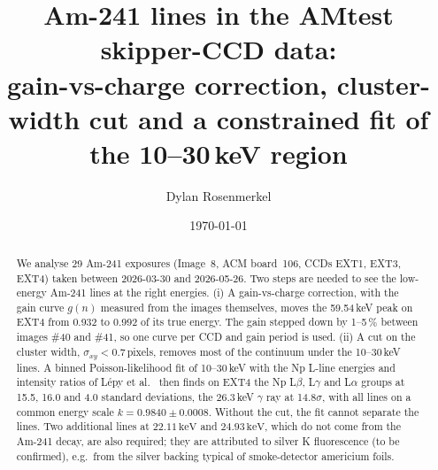 \documentclass[11pt,a4paper]{article}
\title{Am-241 lines in the AMtest skipper-CCD data:\\
gain-vs-charge correction, cluster-width cut and a constrained fit of the 10--30\,keV region}
\author{Dylan Rosenmerkel}
\date{\today}
\newcommand{\sxy}{\sigma_{xy}}
\newcommand{\keV}{\,\mathrm{keV}}
\begin{document}
\maketitle

\begin{abstract}
We analyse 29 Am-241 exposures (Image~8, ACM board~106, CCDs EXT1, EXT3, EXT4) taken between
2026-03-30 and 2026-05-26. Two steps are needed to see the low-energy Am-241 lines at the right energies.
(i) A gain-vs-charge correction, with the gain curve $g(n)$ measured from the images themselves, moves the
59.54\,keV peak on EXT4 from 0.932 to 0.992 of its true energy. The gain stepped down by 1--5\,\% between images
\#40 and \#41, so one curve per CCD and gain period is used. (ii) A cut on the cluster width, $\sxy<0.7$\,pixels,
removes most of the continuum under the 10--30\,keV lines. A binned Poisson-likelihood fit of 10--30\,keV with
the Np L-line energies and intensity ratios of L\'epy et al.~\cite{lepy2008} then finds on EXT4 the Np L$\beta$,
L$\gamma$ and L$\alpha$ groups at 15.5, 16.0 and 4.0 standard deviations, the 26.3\,keV $\gamma$ ray at
14.8$\sigma$, with all lines on a common energy scale $k = 0.9840 \pm 0.0008$. Without the cut, the fit cannot
separate the lines. Two additional lines at $22.11\keV$ and $24.93\keV$, which do not come from the Am-241 decay,
are also required; they are attributed to silver K fluorescence (to be confirmed), e.g.\ from the silver backing
typical of smoke-detector americium foils.
\end{abstract}

\tableofcontents

\end{document}
